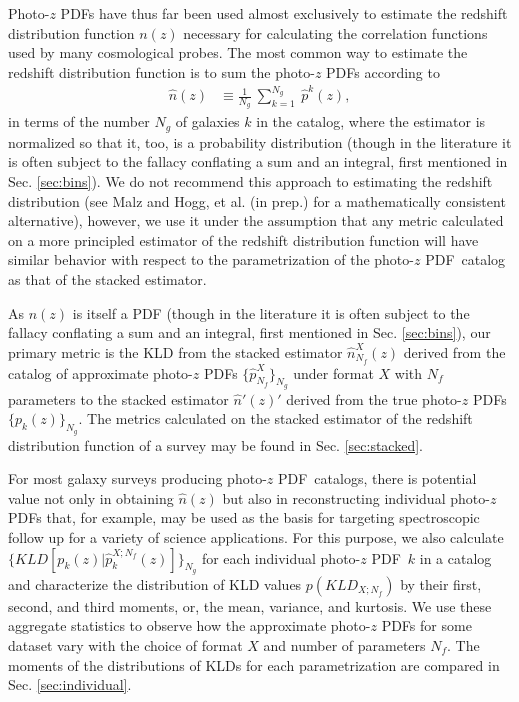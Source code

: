 \documentclass[\docopts]{\docclass}
\newcommand{\pz}{photo-$z$ PDF}
\newcommand{\Pz}{Photo-$z$ PDF}
\begin{document}
\Pz s have thus far been used almost exclusively to estimate the redshift 
distribution function $n(z)$ necessary for calculating the correlation 
functions used by many cosmological probes.  The most common way to estimate 
the redshift distribution function is to sum the \pz s according to
\begin{align}
  \label{eq:nz}
  \hat{n}(z) &\equiv \frac{1}{N_{g}}\ \sum_{k=1}^{N_{g}}\ \hat{p}^{k}(z),
\end{align}
in terms of the number $N_{g}$ of galaxies $k$ in the catalog, where the 
estimator is normalized so that it, too, is a probability distribution (though 
in the literature it is often subject to the fallacy conflating a sum and an 
integral, first mentioned in Sec. \ref{sec:bins}).  We do not recommend this 
approach to estimating the redshift distribution (see Malz and Hogg, et al. (in 
prep.) for a mathematically consistent alternative), however, we use it under 
the assumption that any metric calculated on a more principled estimator of the 
redshift distribution function will have similar behavior with respect to the 
parametrization of the \pz\ catalog as that of the stacked estimator.

As $n(z)$ is itself a PDF (though in the literature it is often subject to the 
fallacy conflating a sum and an integral, first mentioned in Sec. 
\ref{sec:bins}), our primary metric is the KLD from the stacked estimator 
$\hat{n}_{N_{f}}^{X}(z)$ derived from the catalog of approximate \pz s 
$\{\hat{p}^{X}_{N_{f}}\}_{N_{g}}$ under format $X$ with $N_{f}$ parameters to 
the stacked estimator $\hat{n}'(z)'$ derived from the true \pz s 
$\{p_{k}(z)\}_{N_{g}}$.  The metrics calculated on the stacked estimator of the 
redshift distribution function of a survey may be found in Sec. 
\ref{sec:stacked}.

For most galaxy surveys producing \pz\ catalogs, there is potential value not 
only in obtaining $\hat{n}(z)$ but also in reconstructing individual \pz s 
that, for example, may be used as the basis for targeting spectroscopic follow 
up for a variety of science applications.
For this purpose, we also calculate $\{KLD[p_{k}(z) | \hat{p}^{X; 
N_{f}}_{k}(z)]\}_{N_{g}}$ for each individual \pz\ $k$ in a catalog and 
characterize the distribution of KLD values $p(KLD_{X; N_{f}})$ by their first, 
second, and third moments, or, the mean, variance, and kurtosis.  We use these 
aggregate statistics to observe how the approximate \pz s for some dataset vary 
with the choice of format $X$ and number of parameters $N_{f}$.  The moments of 
the distributions of KLDs for each parametrization are compared in Sec. 
\ref{sec:individual}.
\end{document}

